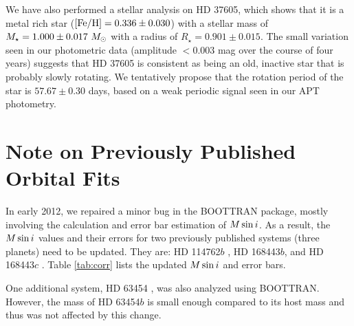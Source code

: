 We have also performed a stellar analysis on HD 37605, which shows
that it is a metal rich star ($[{\rm Fe/H}] = 0.336 \pm 0.030$) with a
stellar mass of $M_\star = 1.000 \pm0.017\ M_{\odot}$ with a radius of
$R_\star = 0.901 \pm 0.015$. The small variation seen in our
photometric data (amplitude $< 0.003$ mag over the course of four
years) suggests that HD 37605 is consistent as being an old, inactive
star that is probably slowly rotating. We tentatively propose that the
rotation period of the star is $57.67 \pm 0.30$ days, based on a weak
periodic signal seen in our APT photometry.


\section{Note on Previously Published Orbital Fits}\label{sec:correction}

In early 2012, we repaired a minor bug in the BOOTTRAN package, mostly
involving the calculation and error bar estimation of $M\sin{i}$. As a
result, the $M\sin{i}$ values and their errors for two previously
published systems (three planets) need to be updated. They are: HD
114762$b$ \citep{Kane114762}, HD 168443$b$, and HD 168443$c$
\citep{Pilyavsky2011}. Table \ref{tab:corr} lists the updated $M\sin{i}$
and error bars.

One additional system, HD 63454 \citep{Kane63454}, was also analyzed
using BOOTTRAN. However, the mass of HD 63454$b$ is small enough
compared to its host mass and thus was not affected by this change.



